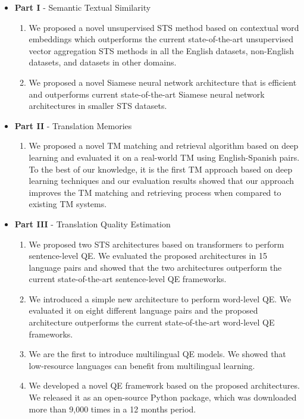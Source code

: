 \begin{itemize}
	\item \textbf{Part I} - Semantic Textual Similarity
	\begin{enumerate}
		\item We proposed a novel unsupervised STS method based on contextual word embeddings which outperforms the current state-of-the-art unsupervised vector aggregation STS methods in all the English datasets, non-English datasets, and datasets in other domains.
		
		\item We proposed a novel Siamese neural network architecture that is efficient and outperforms current state-of-the-art Siamese neural network architectures in smaller STS datasets.  
		
	\end{enumerate}

\vspace{2mm}
	
	\item \textbf{Part II} - Translation Memories
	\begin{enumerate}
		\item We proposed a novel TM matching and retrieval algorithm based on deep learning and evaluated it on a real-world TM using English-Spanish pairs. To the best of our knowledge, it is the first TM approach based on deep learning techniques and our evaluation results showed that our approach improves the TM matching and retrieving process when compared to existing TM systems.
	\end{enumerate}
	
	\item \textbf{Part III} - Translation Quality Estimation
	\begin{enumerate}
		\item  We proposed two STS architectures based on transformers to perform sentence-level QE. We evaluated the proposed architectures in 15 language pairs and showed that the two architectures outperform the current state-of-the-art sentence-level QE frameworks.
		
		\item We introduced a simple new architecture to perform word-level QE. We evaluated it on eight different language pairs and the proposed architecture outperforms the current state-of-the-art word-level QE frameworks.
		
		\item We are the first to introduce multilingual QE models. We showed that low-resource languages can benefit from multilingual learning.
		
		\item We developed a novel QE framework based on the proposed architectures. We released it as an open-source Python package, which was downloaded more than 9,000 times in a 12 months period.
	\end{enumerate}
\end{itemize}

